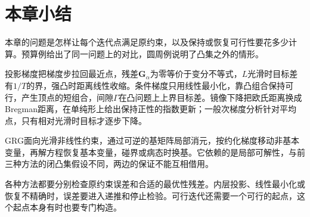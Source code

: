 \section{本章小结}
\label{sec:feas-summary}

本章的问题是怎样让每个迭代点满足原约束，以及保持或恢复可行性要花多少计算。预算例给出了同一问题上的对比，圆周例说明了凸集之外的情形。

投影梯度把梯度步拉回最近点，残差$\bm{G}_\alpha$为零等价于变分不等式，$L$光滑时目标差有$1/T$的界，强凸时距离线性收缩。条件梯度只用线性最小化，靠凸组合保持可行，产生顶点的短组合，间隙$\Gamma$在凸问题上上界目标差。镜像下降把欧氏距离换成Bregman距离，在单纯形上给出保持正性的指数更新；一般次梯度分析针对平均点，只有相对光滑时目标才逐步下降。

GRG面向光滑非线性约束，通过可逆的基矩阵局部消元，按约化梯度移动非基本变量，再解方程恢复基本变量，碰界或病态时换基。它依赖的是局部可解性，与前三种方法的闭凸集假设不同，两边的保证不能互相借用。

各种方法都要分别检查原约束误差和合适的最优性残差。内层投影、线性最小化或恢复不精确时，误差要进入递推和停止检验。可行迭代还需要一个可行的起点，这个起点本身有时也要专门构造。
